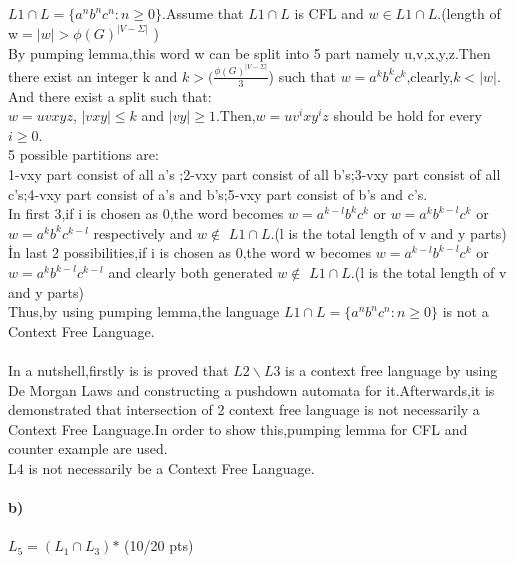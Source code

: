 \documentclass[a4paper,12pt]{article}
\begin{document}
\begin{tcolorbox}
$L1\cap L=\{a^nb^nc^n:n\geq0\}$.Assume that $L1\cap L$ is CFL and $w \in L1\cap L$.(length of w$=|w|>\phi(G)^{|V-\Sigma|}$ )\\By pumping lemma,this word w can be split into 5 part namely u,v,x,y,z.Then there exist an integer k and $k>(\frac{\phi(G)^{|V-\Sigma|}}{3}$) such that
$w=a^kb^kc^k$,clearly,$k<|w|$.\\And there exist a split such that:\\
$w=uvxyz$, $|vxy|\leq k$ and $|vy|\geq 1$.Then,$w=uv^ixy^iz$ should be hold for every $i\geq 0$.\\5 possible partitions are:\\
1-vxy part consist of all a's ;2-vxy part consist of all b's;3-vxy part consist of all c's;4-vxy part consist of a's and b's;5-vxy part consist of  b's and c's.\\
In first 3,if i is chosen as 0,the word becomes $w=a^{k-l}b^kc^k$ or $w=a^kb^{k-l}c^k$ or $w=a^kb^kc^{k-l}$ respectively and $w\notin$ $L1\cap L$.(l is the total length of v and y parts)\\ 
İn last 2 possibilities,if i is chosen as 0,the word w becomes $w=a^{k-l}b^{k-l}c^k$ or $w=a^kb^{k-l}c^{k-l}$ and clearly both generated $w\notin$
$L1\cap L$.(l is the total length of v and y parts)\\
Thus,by using pumping lemma,the language $L1\cap L=\{a^nb^nc^n:n\geq0\}$ is not a Context Free Language.\\\\
In a nutshell,firstly is is proved that $L2 \backslash {L3}$ is a context free language by using De Morgan Laws and constructing a pushdown automata for it.Afterwards,it is demonstrated that intersection of 2 context free language is not necessarily a Context Free Language.In order to show this,pumping lemma for CFL and counter example are used.\\

L4 is not necessarily be a Context Free Language.\\ 
 
\end{tcolorbox}

\paragraph{b)} $L_5 = (L_1 \cap L_3)\text{*}$ \hfill \small{(10/20 pts)} \\
\end{document}
